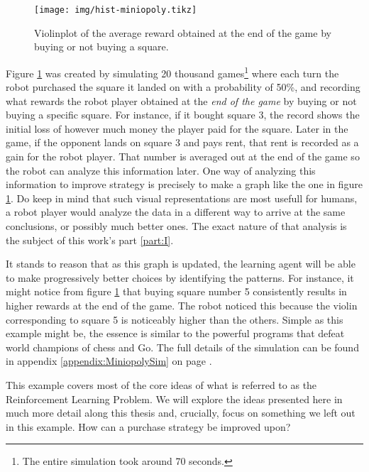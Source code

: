 \begin{figure}
\centering
\texttt{[image: img/hist-miniopoly.tikz]}
\caption{Violinplot of the average reward obtained at the end 
of the game by buying or not buying a square.}
\label{fig:violinplot}
\end{figure}

Figure \ref{fig:violinplot} was created by simulating 20 thousand
games\footnote{The entire simulation took around 70 seconds.} where each turn
the robot purchased the square it landed on with a probability of 50\%, and
recording what rewards the robot player obtained at the \textit{end of the game}
by buying or not buying a specific square. For instance, if it bought square 3,
the record shows the initial loss of however much money the player paid for the
square.  Later in the game, if the opponent lands on square 3 and pays rent,
that rent is recorded as a gain for the robot player. That number is averaged
out at the end of the game so the robot can analyze this information later. One
way of analyzing this information to improve strategy is precisely to make a
graph like the one in figure \ref{fig:violinplot}. Do keep in mind that such
visual representations are most usefull for humans, a robot player would analyze
the data in a different way to arrive at the same conclusions, or possibly much
better ones.  The exact nature of that analysis is the subject of this work's
part \ref{part:I}.

It stands to reason that as this graph is updated, the learning agent will be
able to make progressively better choices by identifying the patterns. For
instance, it might notice from figure \ref{fig:violinplot} that buying square
number 5 consistently results in higher rewards at the end of the game. The
robot noticed this because the violin corresponding to square 5 is noticeably
higher than the others. Simple as this example might be, the essence is similar
to the powerful programs that defeat world champions of chess and Go. The full
details of the simulation can be found in appendix
\ref{appendix:MiniopolySim} on page
\pageref{appendix:MiniopolySim}.

This example covers most of the core ideas of what is referred to as the
Reinforcement Learning Problem. We will explore the ideas presented here in much
more detail along this thesis and, crucially, focus on something we left out in
this example. How can a purchase strategy be improved upon?

